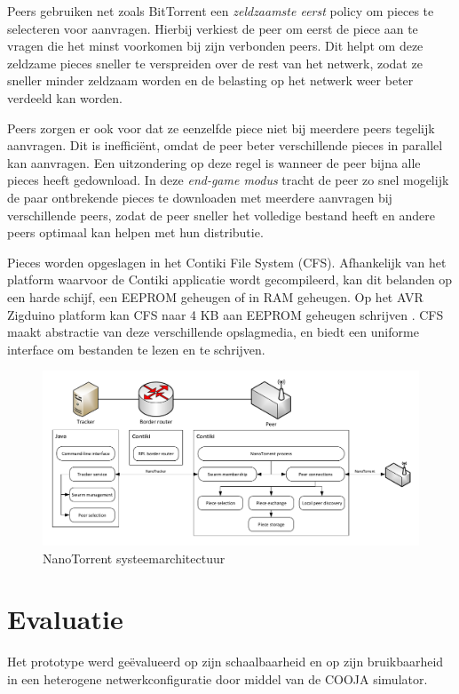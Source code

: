 \documentclass[journal]{IEEEtran}
\begin{document}
Peers gebruiken net zoals BitTorrent een \emph{zeldzaamste eerst} policy om pieces te selecteren voor aanvragen. Hierbij verkiest de peer om eerst de piece aan te vragen die het minst voorkomen bij zijn verbonden peers. Dit helpt om deze zeldzame pieces sneller te verspreiden over de rest van het netwerk, zodat ze sneller minder zeldzaam worden en de belasting op het netwerk weer beter verdeeld kan worden.

Peers zorgen er ook voor dat ze eenzelfde piece niet bij meerdere peers tegelijk aanvragen. Dit is ineffici\"ent, omdat de peer beter verschillende pieces in parallel kan aanvragen. Een uitzondering op deze regel is wanneer de peer bijna alle pieces heeft gedownload. In deze \emph{end-game modus} tracht de peer zo snel mogelijk de paar ontbrekende pieces te downloaden met meerdere aanvragen bij verschillende peers, zodat de peer sneller het volledige bestand heeft en andere peers optimaal kan helpen met hun distributie.

Pieces worden opgeslagen in het Contiki File System (CFS). Afhankelijk van het platform waarvoor de Contiki applicatie wordt gecompileerd, kan dit belanden op een harde schijf, een EEPROM geheugen of in RAM geheugen. Op het AVR Zigduino platform kan CFS naar 4 KB aan EEPROM geheugen schrijven \cite{zigduino-manual}. CFS maakt abstractie van deze verschillende opslagmedia, en biedt een uniforme interface om bestanden te lezen en te schrijven.

\begin{figure}
    \centering
    \includegraphics[width=\linewidth]{diagrams/protocol-architecture.pdf}
    \caption{NanoTorrent systeemarchitectuur}
    \label{fig:impl:architecture}
\end{figure}

\section{Evaluatie}
\label{sec:evaluatie}
Het prototype werd ge\"evalueerd op zijn schaalbaarheid en op zijn bruikbaarheid in een heterogene netwerkconfiguratie door middel van de COOJA simulator.
\end{document}
